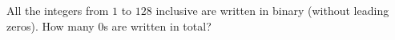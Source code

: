 All the integers from $1$ to $128$ inclusive are written in binary (without leading zeros). How many $0$s are written in total?

